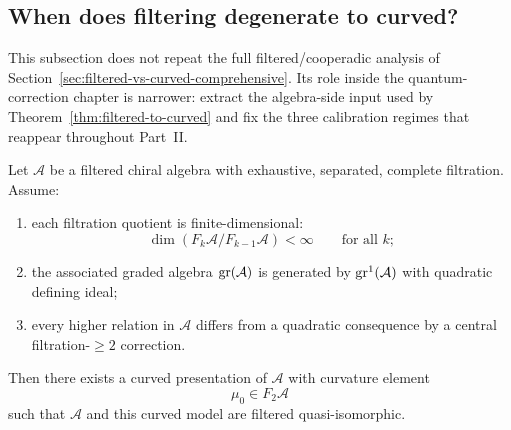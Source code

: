 

\subsection{When does filtering degenerate to curved?}

This subsection does not repeat the full filtered/cooperadic analysis of
Section~\ref{sec:filtered-vs-curved-comprehensive}.  Its role inside the
quantum-correction chapter is narrower: extract the algebra-side input used by
Theorem~\ref{thm:filtered-to-curved} and fix the three calibration regimes
that reappear throughout Part~II.

\begin{proposition}[Filtered \texorpdfstring{$\Rightarrow$}{=>} curved; \ClaimStatusProvedHere]\label{prop:filtered-to-curved-fc}
Let $\mathcal{A}$ be a filtered chiral algebra with exhaustive, separated,
complete filtration. Assume:
\begin{enumerate}
\item each filtration quotient is finite-dimensional:
\[
\dim(F_k\mathcal{A}/F_{k-1}\mathcal{A}) < \infty \qquad \text{for all } k;
\]
\item the associated graded algebra $\operatorname{gr}(\mathcal{A})$ is generated by
  $\operatorname{gr}^1(\mathcal{A})$ with quadratic defining ideal;
\item every higher relation in $\mathcal{A}$ differs from a quadratic
  consequence by a central filtration-$\ge 2$ correction.
\end{enumerate}
Then there exists a curved presentation of $\mathcal{A}$ with curvature element
\[
\mu_0 \in F_2\mathcal{A}
\]
such that $\mathcal{A}$ and this curved model are filtered quasi-isomorphic.
\end{proposition}

